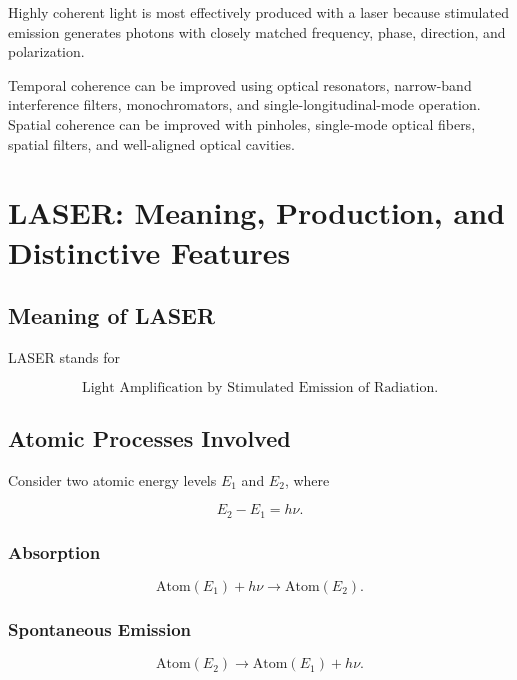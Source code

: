 \documentclass[12pt]{article}
\begin{document}
Highly coherent light is most effectively produced with a laser because stimulated emission generates photons with closely matched frequency, phase, direction, and polarization.

Temporal coherence can be improved using optical resonators, narrow-band interference filters, monochromators, and single-longitudinal-mode operation. Spatial coherence can be improved with pinholes, single-mode optical fibers, spatial filters, and well-aligned optical cavities.

\section{LASER: Meaning, Production, and Distinctive Features}

\subsection{Meaning of LASER}

LASER stands for

\begin{equation}
\boxed{\text{Light Amplification by Stimulated Emission of Radiation}}.
\end{equation}

\subsection{Atomic Processes Involved}

Consider two atomic energy levels $E_1$ and $E_2$, where

\begin{equation}
E_2-E_1=h\nu.
\end{equation}

\subsubsection{Absorption}

\begin{equation}
\mathrm{Atom}(E_1)+h\nu
\rightarrow
\mathrm{Atom}(E_2).
\end{equation}

\subsubsection{Spontaneous Emission}

\begin{equation}
\mathrm{Atom}(E_2)
\rightarrow
\mathrm{Atom}(E_1)+h\nu.
\end{equation}
\end{document}
